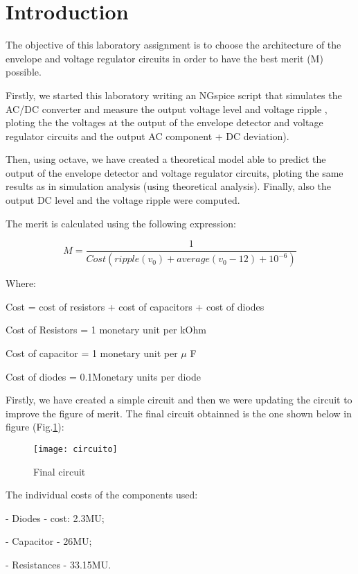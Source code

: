 \section{Introduction}
\label{sec:introduction}

The objective of this laboratory assignment is to choose the architecture of the envelope and voltage regulator circuits in order to have the best merit (M) possible. \par
Firstly, we started this laboratory writing an NGspice script that simulates the AC/DC converter and measure the output voltage level and voltage ripple , ploting the the voltages at the output of the envelope detector and voltage regulator circuits and the output AC component + DC deviation).\par
Then, using octave, we have created a theoretical model able to predict the output of the envelope detector and voltage regulator circuits, ploting the same results as in simulation analysis (using theoretical analysis). Finally, also the output DC level and the voltage ripple were computed. \par

The merit is calculated using the following expression:\par
\begin{equation}
    M = \frac{1}{Cost(ripple(v_0)+average(v_0-12)+10^{-6})}
\end{equation}\par
Where: \par
Cost = cost of resistors + cost of capacitors + cost of diodes \par
Cost of Resistors = 1 monetary unit per kOhm \par
Cost of capacitor = 1 monetary unit per $\mu$ F \par
Cost of diodes = 0.1Monetary units per diode \par
Firstly, we have created a simple circuit and then we were updating the circuit to improve the figure of merit. The final circuit obtainned is the one shown below in figure (Fig.\ref{fig:circuito}): \par

\begin{figure}[H]
\centering
\texttt{[image: circuito]}
\caption{Final circuit}
\label{fig:circuito}
\end{figure}

The individual costs of the components used: \par
- Diodes - cost: 2.3MU; \par
- Capacitor - 26MU; \par
- Resistances - 33.15MU. \par

